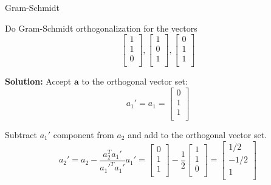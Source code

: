 \documentclass{beamer}
\begin{document}
\begin{frame}{Gram-Schmidt}
\begin{example}
Do Gram-Schmidt orthogonalization for the vectors
\begin{equation*}
    \left[ \begin{array}{c}
        1\\
        1\\
        0\\
    \end{array} \right] , \left[ \begin{array}{c}
        1\\
        0\\
        1\\
    \end{array} \right] , \left[ \begin{array}{c}
        0\\
        1\\
        1\\
    \end{array} \right]
\end{equation*}
\end{example}
\textbf{Solution:}
Accept $\mathbf{a}$ to the orthogonal vector set:
\begin{equation*}
    a_1'=a_1=\left[ \begin{array}{c}
        0\\
        1\\
        1\\
    \end{array} \right]
\end{equation*}

Subtract $a_1'$ component from $a_2$ and add to the orthogonal vector set.
\begin{equation*}
    a_2'=a_2-\frac{a_2^Ta_1'}{a_1'^Ta_1'}a_1'=\left[ \begin{array}{c}
        0\\
        1\\
        1\\
    \end{array} \right] -\frac{1}{2}\left[ \begin{array}{c}
        1\\
        1\\
        0\\
    \end{array} \right] =\left[ \begin{array}{c}
        1/2\\
        -1/2\\
        1\\
    \end{array} \right]
\end{equation*}

\end{frame}
\end{document}
